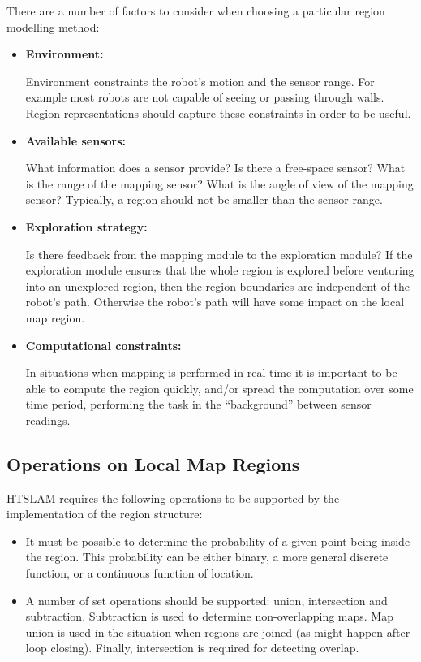 There are a number of factors to consider when choosing a particular
region modelling method:
\begin{itemize}
  \item \textbf{Environment:}
    
    Environment constraints the robot's motion and the sensor range.
    For example most robots are not capable of seeing or passing
    through walls. Region representations should capture these
    constraints in order to be useful.

  \item \textbf{Available sensors:}
    
    What information does a sensor provide? Is there a free-space sensor?
    What is the range of the mapping sensor? What is the angle of view
    of the mapping sensor? Typically, a region should not be smaller than
    the sensor range.
    
  \item \textbf{Exploration strategy:} 
    
    Is there feedback from the mapping module to the exploration
    module?  If the exploration module ensures that the whole region
    is explored before venturing into an unexplored region, then the
    region boundaries are independent of the robot's path. Otherwise
    the robot's path will have some impact on the local map region.

  \item \textbf{Computational constraints:}
    
    In situations when mapping is performed in real-time it is
    important to be able to compute the region quickly, and/or spread
    the computation over some time period, performing the task in the
    ``background'' between sensor readings.

\end{itemize}

\subsection{Operations on Local Map Regions}

HTSLAM requires the following operations to be supported by the
implementation of the region structure:

\begin{itemize}
\item It must be possible to determine the probability of a given
  point being inside the region. This probability can be either
  binary, a more general discrete function, or a continuous function
  of location.
 
\item A number of set operations should be supported:
  union, intersection and subtraction. Subtraction is used to
  determine non-overlapping maps. Map union is used in the situation
  when regions are joined (as might happen after loop closing).
  Finally, intersection is required for detecting overlap.

\end{itemize}

